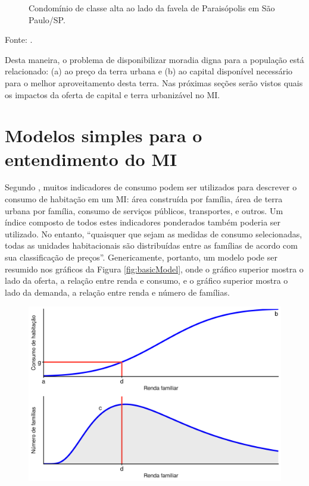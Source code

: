 \documentclass[
	12pt,				%
	oneside,			%
	a4paper,			%
	chapter=TITLE,		%
	section=TITLE,		%
	english,			%
	brazil				%
	]{abntex2}
\newcommand{\bcenter}{\begin{center}}
\newcommand{\ecenter}{\end{center}}
\begin{document}
\begin{refsection}
\begin{figure}[H]
{}

\caption{Condomínio de classe alta ao lado da favela de Paraisópolis em São Paulo/SP.}\label{fig:injustica}
\end{figure}
\bcenter

Fonte: \textcite{paraisopolis}.
\ecenter

Desta maneira, o problema de disponibilizar moradia digna para a população
está relacionado: (a) ao preço da terra urbana e (b) ao capital disponível
necessário para o melhor aproveitamento desta terra. Nas próximas seções serão
vistos quais os impactos da oferta de capital e terra urbanizável no \gls{MI}.

\hypertarget{modelos-simples-para-o-entendimento-do}{%
\section{\texorpdfstring{Modelos simples para o entendimento do \gls{MI}}{Modelos simples para o entendimento do }}\label{modelos-simples-para-o-entendimento-do}}

Segundo \textcite[p.~247]{bertaud}, muitos indicadores de consumo podem ser utilizados
para descrever o consumo de habitação em um \gls{MI}: área construída por
família, área de terra urbana por família, consumo de serviços públicos,
transportes, e outros. Um índice composto de todos estes indicadores ponderados
também poderia ser utilizado. No entanto, ``quaisquer que sejam as medidas de
consumo selecionadas, todas as unidades habitacionais são distribuídas entre as
famílias de acordo com sua classificação de preços''. Genericamente, portanto, um
modelo pode ser resumido nos gráficos da Figura \ref{fig:basicModel}, onde o
gráfico superior mostra o lado da oferta, a relação entre renda e consumo, e o
gráfico superior mostra o lado da demanda, a relação entre renda e número de
famílias.
\begin{figure}[H]

{\centering \includegraphics[width=0.7\linewidth]{images/basicModel-1} 

}
\end{figure}
\end{refsection}
\end{document}

